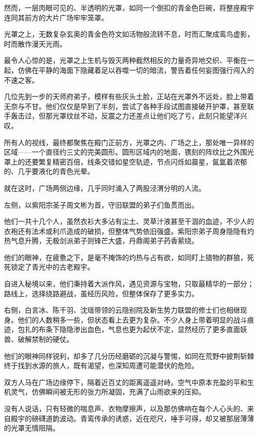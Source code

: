 然而，一层肉眼可见的、半透明的光罩，如同一个倒扣的青金色巨碗，将整座殿宇连同其前方的大片广场牢牢笼罩。

光罩之上，无数复杂玄奥的青金色符文如活物般流转不息，时而汇聚成鸾鸟虚影，时而散作漫天光雨。

最令人心惊的是，光罩之上生机与毁灭两种截然相反的力量奇异地交织、平衡在一起，仿佛在平静的海面下隐藏着足以吞噬一切的暗流，警告着任何妄图强行闯入的不速之客。

\vspace{2em}

几位先到一步的天师府弟子，模样有些灰头土脸，正站在光罩外不远处，脸上带着无奈与不甘。他们仅仅是早到了半刻，尝试了各种手段试图直接破开护罩，甚至联手轰击过，但那光罩纹丝不动，反震之力还差点让他们吃了亏，此刻只能望洋兴叹。

所有人的视线，最终都聚焦在殿门正前方，光罩之内、广场之上，那处唯一异样的区域——一个直径约三丈的完美圆形。圆形区域内的地面，镌刻的阵纹比之外围光罩上的还要繁复精密百倍，线条交错如星空轨迹，节点闪烁如晨星，氤氲着浓郁的、几乎要液化的青色光晕。

就在这时，广场两侧边缘，几乎同时涌入了两股泾渭分明的人流。

左侧，以紫阳宗圣子周文彬为首，守旧联盟的弟子们鱼贯而出。

他们一共十几个人，虽然衣衫大多沾有尘土、灵草汁液甚至干涸的血迹，不少人的衣袍还有法术或利爪造成的破损，但整体气势依旧强盛。紫阳宗弟子周身隐隐有灼热气息升腾，无极剑派弟子则锋芒大盛，丹鼎阁弟子药香萦绕。

他们的眼神，在疲惫之下，是毫不掩饰的灼热与占有欲，如同盯上猎物的群狼，死死锁定了青光中的古老殿宇。

自进入秘境以来，他们秉持着大派作风，遇见资源与宝物，只取最精华的一部分；路线上，选择绕路避战，虽经历风险，但整体保存了更多实力。

右侧，白言冰、陈千羽、沈瑶带领的云隐别院及新生势力联盟的修士们也相继现身。他们的人数稍多一些，但状态看上去更为复杂。不少人身上带着明显的战斗痕迹，包扎的布条下隐隐渗出血色，气息也更为起伏不定，显然经历了更多直面妖兽、破解禁制的硬仗。

他们的眼神同样锐利，却多了几分历经磨砺的沉凝与警惕，如同在荒野中披荆斩棘终于找到水源的旅人，既有渴望，也深知周遭可能潜伏的危险。

\vspace{2em}

双方人马在广场边缘停下，隔着近百丈的距离遥遥对峙。空气中原本充盈的平和生机灵气，仿佛瞬间被无形的张力所凝固，充满了山雨欲来的压抑。

没有人说话，只有轻微的喘息声、衣物摩擦声，以及那仿佛响在每个人心头的、来自殿宇的磅礴道韵波动。青鸾传承的诱惑，近在咫尺，唾手可得，却又被那层薄薄的光罩无情阻隔。

